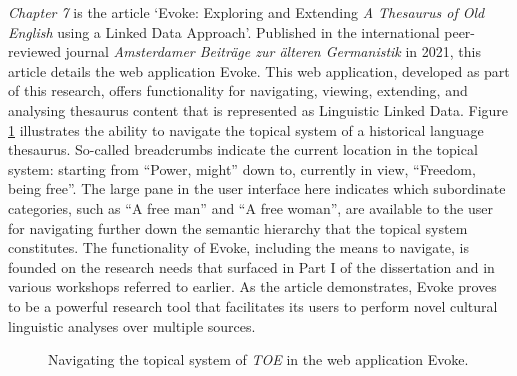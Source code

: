 \textit{Chapter 7} is the article `Evoke: Exploring and Extending \textit{A Thesaurus of Old English} using a Linked Data Approach'. Published in the international peer-reviewed journal \textit{Amsterdamer Beiträge zur älteren
Germanistik} in 2021, this article details the web application Evoke. This web application, developed as part of this research, offers functionality for navigating, viewing, extending, and analysing thesaurus content that is represented as Linguistic Linked Data. Figure \ref{fig:Introduction:Evoke} illustrates the ability to navigate the topical system of a historical language thesaurus. So-called breadcrumbs indicate the current location in the topical system: starting from ``Power, might'' down to, currently in view, ``Freedom, being free''. The large pane in the user interface here indicates which subordinate categories, such as ``A free man'' and ``A free woman'', are available to the user for navigating further down the semantic hierarchy that the topical system constitutes. The functionality of Evoke, including the means to navigate, is founded on the research needs that surfaced in Part I of the dissertation and in various workshops referred to earlier. As the article demonstrates, Evoke proves to be a powerful research tool that facilitates its users to perform novel cultural linguistic analyses over multiple sources.

\begin{figure}[htb!]
	\caption[]{\label{fig:Introduction:Evoke} Navigating the topical system of \textit{TOE} in the web application Evoke.}
\end{figure}


